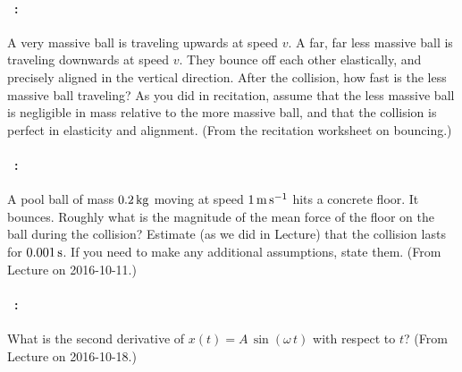 \documentclass[12pt]{article} 
\begin{document}
\clearpage
\paragraph{\problemname~\theproblem:}%
A very massive ball is traveling upwards at speed $v$. A far, far less
massive ball is traveling downwards at speed $v$. They bounce off each
other elastically, and precisely aligned in the vertical
direction. After the collision, how fast is the less massive ball
traveling? As you did in recitation, assume that the less massive ball
is negligible in mass relative to the more massive ball, and that the
collision is perfect in elasticity and alignment. (From the recitation
worksheet on bouncing.)

\vfill

\paragraph{\problemname~\theproblem:}%
A pool ball of mass $0.2\,\mathrm{kg}$ moving at speed $1\,\mathrm{m}\,\mathrm{s}^{-1}$ hits a
concrete floor. It bounces. Roughly what is the magnitude of the mean
force of the floor on the ball during the collision? Estimate (as we
did in Lecture) that the collision lasts for $0.001\,\mathrm{s}$. If you need
to make any additional assumptions, state them. (From Lecture on
2016-10-11.)

\vfill

\paragraph{\problemname~\theproblem:}%
What is the second derivative of $x(t) = A\,\sin(\omega\,t)$ with respect to
$t$? (From Lecture on 2016-10-18.)

\vfill
~
\end{document}
